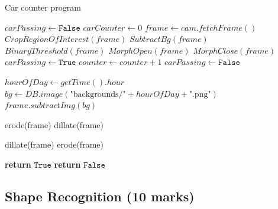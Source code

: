 \begin{algorithm}
    \caption{Car counter program}\label{carCounterProg}
    \begin{algorithmic}[1]
            \State $ carPassing \leftarrow \texttt{False} $
            \State $ carCounter \leftarrow 0 $
            \Loop
                \State $ frame \leftarrow cam.fetchFrame() $
                \State $ CropRegionOfInterest(frame) $ 
                \State $ SubtractBg(frame) $
                \State $ BinaryThreshold(frame) $
                \State $ MorphOpen(frame) $
                \State $ MorphClose(frame) $
                        \State $ carPassing \leftarrow \texttt{True} $
                        \State $ counter \leftarrow counter + 1 $
                    \EndIf
                    \State $ carPassing \leftarrow \texttt{False} $
                \EndIf
            \EndLoop
        \EndProcedure

        \Statex

            \State $ hourOfDay \leftarrow getTime().hour $
            \State $ bg \leftarrow DB.image(\text{"backgrounds/"} + hourOfDay + \text{".png"}) $
            \State $ frame.subtractImg(bg) $
        \EndFunction

        \Statex

            \State erode(frame)
            \State dillate(frame)
        \EndFunction

        \Statex

            \State dillate(frame)
            \State erode(frame)
        \EndFunction

        \Statex

                        \State \textbf{return} $ \texttt{True} $
                    \EndIf
                \EndFor
            \EndFor
            \State \textbf{return} $ \texttt{False} $
        \EndFunction
    \end{algorithmic}
\end{algorithm}

\clearpage


\subsection{Shape Recognition (10 marks)}

\newpage

